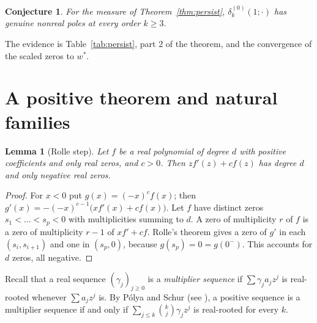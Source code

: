 \documentclass[11pt,a4paper]{article}
\newtheorem{lemma}[theorem]{Lemma}
\newtheorem{conjecture}[theorem]{Conjecture}
\theoremstyle{definition}
\theoremstyle{remark}
\begin{document}
\begin{conjecture}\label{conj:persist}
For the measure of Theorem~\ref{thm:persist}, $\delta_k^{(0)}(1;\cdot)$ has
genuine nonreal poles at every order $k\ge3$.
\end{conjecture}

The evidence is Table~\ref{tab:persist}, part 2 of the theorem, and the
convergence of the scaled zeros to $w^*$.

\section{A positive theorem and natural families}\label{sec:positive}

\begin{lemma}[Rolle step]\label{lem:rolle}
Let $f$ be a real polynomial of degree $d$ with positive coefficients and
only real zeros, and $c>0$. Then $zf'(z)+cf(z)$ has degree $d$ and only
negative real zeros.
\end{lemma}
\begin{proof}
For $x<0$ put $g(x)=(-x)^cf(x)$; then
$g'(x)=-(-x)^{c-1}\bigl(xf'(x)+cf(x)\bigr)$. Let $f$ have distinct zeros
$s_1<\dots<s_p<0$ with multiplicities summing to $d$. A zero of
multiplicity $r$ of $f$ is a zero of multiplicity $r-1$ of $xf'+cf$. Rolle's
theorem gives a zero of $g'$ in each $(s_i,s_{i+1})$ and one in $(s_p,0)$,
because $g(s_p)=0=g(0^-)$. This accounts for $d$ zeros, all negative.
\end{proof}

Recall that a real sequence $(\gamma_j)_{j\ge0}$ is a \emph{multiplier
sequence} if $\sum\gamma_ja_jz^j$ is real-rooted whenever $\sum a_jz^j$ is.
By Pólya and Schur \cite{PolyaSchur1914} (see \cite{CravenCsordas1989}), a
positive sequence is a multiplier sequence if and only if
$\sum_{j\le k}\binom kj\gamma_jz^j$ is real-rooted for every $k$.
\end{document}
